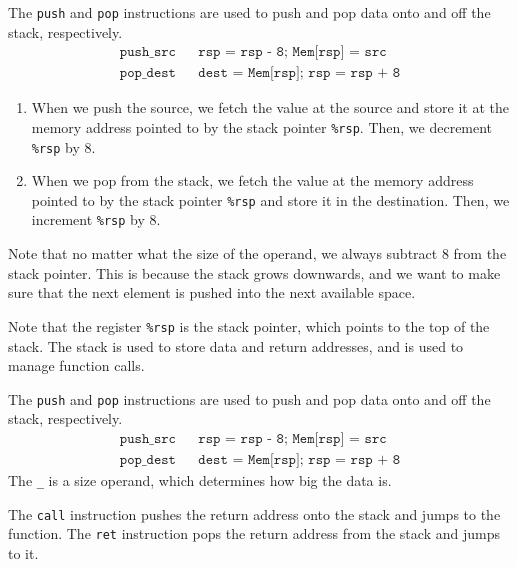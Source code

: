 \documentclass{article}
\begin{document}
  \begin{definition}
    The \texttt{push} and \texttt{pop} instructions are used to push and pop data onto and off the stack, respectively. 
    \begin{align*}
      \texttt{push\_ src} && \texttt{rsp = rsp - 8; Mem[rsp] = src} \\
      \texttt{pop\_ dest} && \texttt{dest = Mem[rsp]; rsp = rsp + 8} 
    \end{align*}
    \begin{enumerate}
      \item When we push the source, we fetch the value at the source and store it at the memory address pointed to by the stack pointer \texttt{\%rsp}. Then, we decrement \texttt{\%rsp} by 8.
      \item When we pop from the stack, we fetch the value at the memory address pointed to by the stack pointer \texttt{\%rsp} and store it in the destination. Then, we increment \texttt{\%rsp} by 8.
    \end{enumerate}
    Note that no matter what the size of the operand, we always subtract 8 from the stack pointer. This is because the stack grows downwards, and we want to make sure that the next element is pushed into the next available space.
  \end{definition}

  Note that the register \texttt{\%rsp} is the stack pointer, which points to the top of the stack. The stack is used to store data and return addresses, and is used to manage function calls. 

  \begin{definition}
    The \texttt{push} and \texttt{pop} instructions are used to push and pop data onto and off the stack, respectively. 
    \begin{align*}
      \texttt{push\_ src} && \texttt{rsp = rsp - 8; Mem[rsp] = src} \\
      \texttt{pop\_ dest} && \texttt{dest = Mem[rsp]; rsp = rsp + 8} 
    \end{align*}
    The \texttt{\_} is a size operand, which determines how big the data is.
  \end{definition}

  \begin{definition}
    The \texttt{call} instruction pushes the return address onto the stack and jumps to the function. The \texttt{ret} instruction pops the return address from the stack and jumps to it.
  \end{definition}
\end{document}
